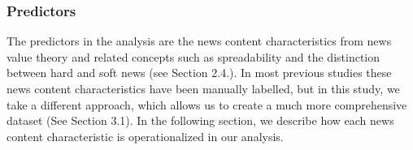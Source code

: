 \documentclass[
]{article}
\begin{document}
\begin{table}[H]
\caption{\label{operationalization-table}Outcomes}
\centering
{}
\end{table}

\hypertarget{predictors}{%
\subsubsection{Predictors}\label{predictors}}

\noindent The predictors in the analysis are the news content
characteristics from news value theory and related concepts such as
spreadability and the distinction between hard and soft news (see
Section 2.4.). In most previous studies these news content
characteristics have been manually labelled, but in this study, we take
a different approach, which allows us to create a much more
comprehensive dataset (See Section 3.1). In the following section, we
describe how each news content characteristic is operationalized in our
analysis.
\end{document}
